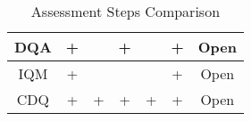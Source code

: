 \documentclass[pdftex,english,oribibl]{llncs}
\begin{document}
\begin{table}[]
\begin{tabular}{|c|c|c|c|c|c|c|}
DQA                                                         & +                                                       &                                                                     & +                                                                          &                                                            & +                                                                & Open                                                                                      \\ \hline
IQM                                                         & +                                                       &                                                                     &                                                                            &                                                            & +                                                                & Open                                                                                      \\ \hline
CDQ                                                         & +                                                       & +                                                                   & +                                                                          & +                                                          & +                                                                & Open                                                                                      \\ \hline
\end{tabular}
\caption{Assessment Steps Comparison}
\label{table:AssessmentStepsComparison}
\end{table}
\end{document}

